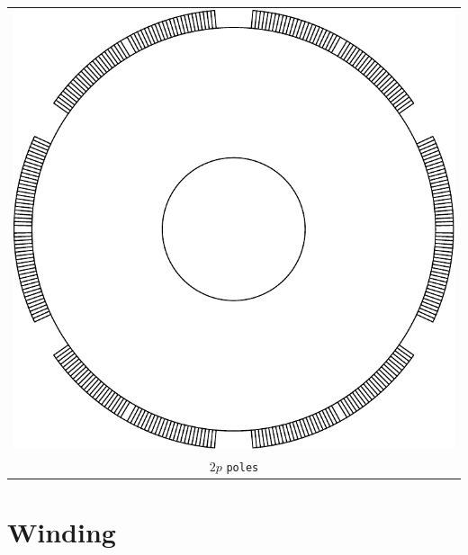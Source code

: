 \documentclass[a4paper,11pt,oneside]{report}
\begin{document}
\begin{tabular}{c}
\includegraphics[scale=0.75]{../SPM/examples/rotors/2ppole} 
\\
$ 2p $ \texttt{poles}
\end{tabular}




\chapter{Winding}
\end{document}
